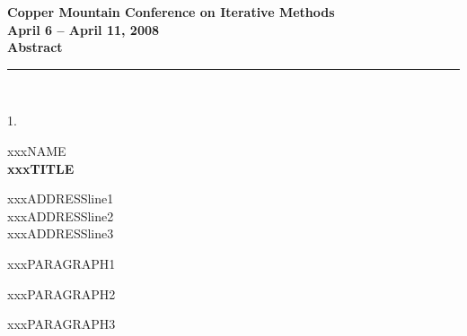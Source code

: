 \documentclass{report}
\begin{document}
\begin{center}
{\Large \bf Copper Mountain Conference on Iterative Methods} \\
{\large \bf April 6 -- April 11, 2008} \\
{\huge \bf Abstract}
\end{center}


\begin{center}
\rule{6in}{1pt}\\
{\large 1. \rule{0mm}{1.5em} xxxNAME \\
{\bf xxxTITLE }}
\end{center}

\begin{center}
	xxxADDRESSline1 \\
	xxxADDRESSline2 \\
	xxxADDRESSline3
\end{center}

xxxPARAGRAPH1

xxxPARAGRAPH2

xxxPARAGRAPH3
\end{document}
